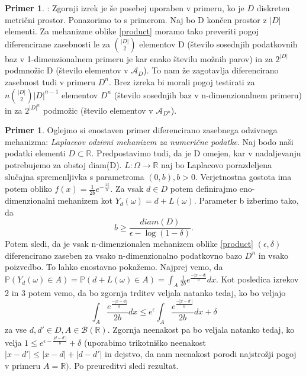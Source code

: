 \documentclass[12pt,a4paper]{amsart}
\theoremstyle{definition} %
\newtheorem{primer}[definicija]{Primer}
\theoremstyle{plain} %
\begin{document}
\newline
\newline
\begin{primer}: Zgornji izrek je še posebej uporaben v primeru, ko je $D$ diskreten metrični prostor. Ponazorimo to s primerom. Naj bo D končen prostor z $|D|$ elementi. Za mehanizme oblike \eqref{product} moramo tako preveriti pogoj diferencirane zasebnosti le za $\binom{|D|}{2}$ elementov D (število sosednjih podatkovnih baz v 1-dimenzionalnem primeru je kar enako številu možnih parov) in za $2^{|D|}$ podmnožic D (število elementov v $\mathcal{A}_D$). To nam že zagotavlja diferencirano zasebnost tudi v primeru $D^n$.  Brez izreka bi morali pogoj testirati za $n\binom{|D|}{2}|D|^{n-1}$ elementov $D^n$ (število sosednjih baz v n-dimenzionalnem primeru) in za $2^{|D|^n}$ podmožic (število elementov v $\mathcal{A}_{D^n}$).
\end{primer}
\begin{primer}  Oglejmo si enostaven primer diferencirano zasebnega odzivnega mehanizma: \textit{Laplaceov odzivni mehanizem za numerične podatke}. Naj bodo naši podatki elementi $D \subset \mathbb{R}$. Predpostavimo tudi, da je D omejen, kar v nadaljevanju potrebujemo za obstoj diam(D). $L: \Omega \rightarrow \mathbb{R}$ naj bo Laplacovo porazdeljena slučajna spremenljivka s parametroma $(0,b), b > 0$.  
Verjetnostna gostota ima potem obliko $f(x)=\frac{1}{2b}e^{-\frac{|x|}{b}}$.  Za vsak $d \in D$ potem definirajmo eno-dimenzionalni mehanizem kot  $Y_{d}(\omega) = d + L(\omega)$. Parameter b izberimo tako, da 
$$b\geq \frac{diam(D)}{\epsilon - \log(1-\delta)}.$$
Potem sledi, da je vsak n-dimenzionalen mehanizem oblike \eqref{product} $(\epsilon, \delta)$ diferencirano zaseben za vsako n-dimenzionalno podatkovno bazo $D^n$ in vsako poizvedbo. To lahko enostavno pokažemo. 
\newline
\newline
Najprej vemo, da $\mathbb{P}(Y_{d}(\omega) \in A) = \mathbb{P}(d + L(\omega) \in A) = \int_{A}\frac{1}{2b}e^{\frac{-|x-d|}{b}}dx$. Kot posledica izrekov 2 in 3 potem vemo, da bo zgornja trditev veljala natanko tedaj, ko bo veljajo 
$$\int_{A}\frac{e^{\frac{-|x-d|}{b}}}{2b}dx \leq e^{\epsilon}\int_{A}\frac{e^{\frac{-|x-d'|}{b}}}{2b}dx + \delta$$
za vse $d,d' \in D, A \in \mathcal{B}(\mathbb{R})$. Zgornja neenakost pa bo veljala natanko tedaj, ko velja $1 \leq e^{\epsilon - \frac{|d-d'|}{b}} + \delta$ (uporabimo trikotniško neenakost $|x-d'| \leq |x-d| + |d -d'|$ in dejstvo, da nam neenakost porodi najstrožji pogoj v primeru $A=\mathbb{R})$. Po preureditvi sledi rezultat. 
\end{primer}
\end{document}
